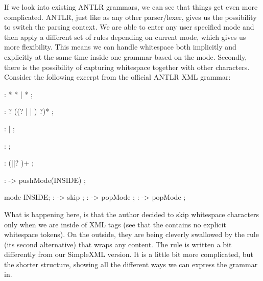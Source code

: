 If we look into existing ANTLR grammars, we can see that things get even more complicated.
ANTLR, just like as any other parser/lexer, gives us the possibility to switch the parsing context.
We are able to enter any user specified mode and then apply a different set of rules depending on current mode, which gives us more flexibility.
This means we can handle whitespace both implicitly and explicitly at the same time inside one grammar based on the mode.
Secondly, there is the possibility of capturing whitespace together with other characters.
Consider the following excerpt from the official ANTLR XML grammar:

\begin{antlr}
	     :   \literal{<}  * \literal{>} * \literal{</}  \literal{>}
	            |   \literal{<}  * \literal{/>}
	            ;

	     :   ?
                ((? |  | ) ?)* ;

	    :    |  ;

	        :   \regex{~[<&]+} ;

	      :   (\literal{ }||? )+ ;

	        :   \literal{<}             -> pushMode(INSIDE) ;

	mode INSIDE;
	           :          -> skip ;
	       :   \literal{<}             -> popMode ;
	 :   \literal{/>}            -> popMode ;
\end{antlr}

What is happening here, is that the author decided to skip whitespace characters only when we are inside of XML tags (see that the  contains no explicit whitespace tokens).
On the outside, they are being cleverly swallowed by the  rule (its second alternative) that wraps any content.
The  rule is written a bit differently from our SimpleXML version.
It is a little bit more complicated, but the shorter structure, showing all the different ways we can express the grammar in.
\\

